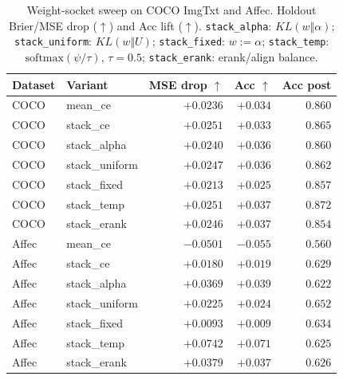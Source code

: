\begin{table}[t]
\centering
\caption{Weight-socket sweep on COCO ImgTxt and Affec.
Holdout Brier/MSE drop ($\uparrow$) and Acc lift ($\uparrow$).
\texttt{stack\_alpha}: $KL(w\Vert\alpha)$;
\texttt{stack\_uniform}: $KL(w\Vert U)$;
\texttt{stack\_fixed}: $w:=\alpha$;
\texttt{stack\_temp}: $\mathrm{softmax}(\psi/\tau)$, $\tau=0.5$;
\texttt{stack\_erank}: erank/align balance.}
\label{tab:agod-weight-sweep}
\begin{tabular}{llrrr}
\toprule
Dataset & Variant & MSE drop $\uparrow$ & Acc $\uparrow$ & Acc post \\
\midrule
COCO  & mean\_ce         & $+0.0236$ & $+0.034$ & $0.860$ \\
COCO  & stack\_ce        & $+0.0251$ & $+0.033$ & $0.865$ \\
COCO  & stack\_alpha     & $+0.0240$ & $+0.036$ & $0.860$ \\
COCO  & stack\_uniform   & $+0.0247$ & $+0.036$ & $0.862$ \\
COCO  & stack\_fixed     & $+0.0213$ & $+0.025$ & $0.857$ \\
COCO  & stack\_temp      & $+0.0251$ & $+0.037$ & $0.872$ \\
COCO  & stack\_erank     & $+0.0246$ & $+0.037$ & $0.854$ \\
\midrule
Affec & mean\_ce         & $-0.0501$ & $-0.055$ & $0.560$ \\
Affec & stack\_ce        & $+0.0180$ & $+0.019$ & $0.629$ \\
Affec & stack\_alpha     & $+0.0369$ & $+0.039$ & $0.622$ \\
Affec & stack\_uniform   & $+0.0225$ & $+0.024$ & $0.652$ \\
Affec & stack\_fixed     & $+0.0093$ & $+0.009$ & $0.634$ \\
Affec & stack\_temp      & $+0.0742$ & $+0.071$ & $0.625$ \\
Affec & stack\_erank     & $+0.0379$ & $+0.037$ & $0.626$ \\
\bottomrule
\end{tabular}
\end{table}

